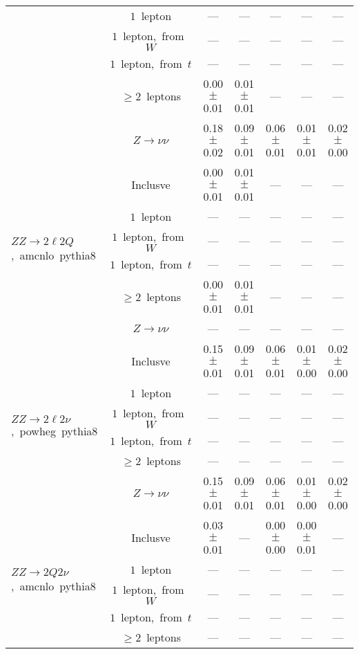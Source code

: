 \documentclass{article}
\begin{document}
\begin{longtable}{|l|c|c|c|c|c|c|}
 & $1$~lepton  & ---  & ---  & ---  & ---  & --- \\* 
 & $1$~lepton,~from~$W$  & ---  & ---  & ---  & ---  & --- \\* 
 & $1$~lepton,~from~$t$  & ---  & ---  & ---  & ---  & --- \\* 
 & $\ge2$~leptons  & 0.00 $\pm$ 0.01  & 0.01 $\pm$ 0.01  & ---  & ---  & --- \\* 
 & $Z\rightarrow\nu\nu$  & 0.18 $\pm$ 0.02  & 0.09 $\pm$ 0.01  & 0.06 $\pm$ 0.01  & 0.01 $\pm$ 0.01  & 0.02 $\pm$ 0.00 \\* 
\hline 
\multirow{6}{*}{$ZZ{\rightarrow}2{\ell}2Q$,~amcnlo~pythia8} & Inclusve  & 0.00 $\pm$ 0.01  & 0.01 $\pm$ 0.01  & ---  & ---  & --- \\* 
 & $1$~lepton  & ---  & ---  & ---  & ---  & --- \\* 
 & $1$~lepton,~from~$W$  & ---  & ---  & ---  & ---  & --- \\* 
 & $1$~lepton,~from~$t$  & ---  & ---  & ---  & ---  & --- \\* 
 & $\ge2$~leptons  & 0.00 $\pm$ 0.01  & 0.01 $\pm$ 0.01  & ---  & ---  & --- \\* 
 & $Z\rightarrow\nu\nu$  & ---  & ---  & ---  & ---  & --- \\* 
\hline 
\multirow{6}{*}{$ZZ{\rightarrow}2{\ell}2{\nu}$,~powheg~pythia8} & Inclusve  & 0.15 $\pm$ 0.01  & 0.09 $\pm$ 0.01  & 0.06 $\pm$ 0.01  & 0.01 $\pm$ 0.00  & 0.02 $\pm$ 0.00 \\* 
 & $1$~lepton  & ---  & ---  & ---  & ---  & --- \\* 
 & $1$~lepton,~from~$W$  & ---  & ---  & ---  & ---  & --- \\* 
 & $1$~lepton,~from~$t$  & ---  & ---  & ---  & ---  & --- \\* 
 & $\ge2$~leptons  & ---  & ---  & ---  & ---  & --- \\* 
 & $Z\rightarrow\nu\nu$  & 0.15 $\pm$ 0.01  & 0.09 $\pm$ 0.01  & 0.06 $\pm$ 0.01  & 0.01 $\pm$ 0.00  & 0.02 $\pm$ 0.00 \\* 
\hline 
\multirow{6}{*}{$ZZ{\rightarrow}2Q2{\nu}$,~amcnlo~pythia8} & Inclusve  & 0.03 $\pm$ 0.01  & ---  & 0.00 $\pm$ 0.00  & 0.00 $\pm$ 0.01  & --- \\* 
 & $1$~lepton  & ---  & ---  & ---  & ---  & --- \\* 
 & $1$~lepton,~from~$W$  & ---  & ---  & ---  & ---  & --- \\* 
 & $1$~lepton,~from~$t$  & ---  & ---  & ---  & ---  & --- \\* 
 & $\ge2$~leptons  & ---  & ---  & ---  & ---  & --- \\* 

\end{longtable}
\end{document}
